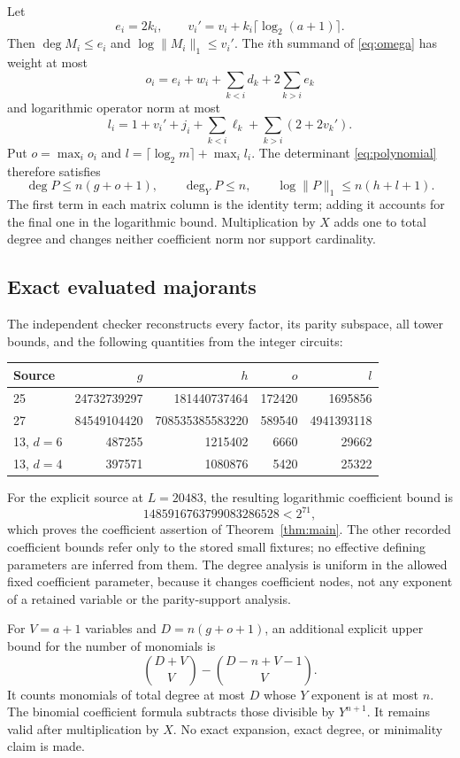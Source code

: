 \documentclass[11pt,a4paper]{article}
\theoremstyle{remark}\newtheorem{remark}[theorem]{Remark}
\begin{document}
Let
\[
 e_i=2k_i,\qquad v_i'=v_i+k_i\lceil\log_2(a+1)\rceil.
\]
Then $\deg M_i\le e_i$ and $\log\|M_i\|_1\le v_i'$.
The $i$th summand of \eqref{eq:omega} has weight at most
\[
 o_i=e_i+w_i+\sum_{k<i}d_k+2\sum_{k>i}e_k
\]
and logarithmic operator norm at most
\[
 l_i=1+v_i'+j_i+\sum_{k<i}\ell_k+\sum_{k>i}(2+2v_k').
\]
Put $o=\max_i o_i$ and $l=\lceil\log_2m\rceil+\max_i l_i$.
The determinant \eqref{eq:polynomial} therefore satisfies
\begin{equation}\label{eq:finalbounds}
 \deg P\le n(g+o+1),\qquad \deg_Y P\le n,\qquad
                         \log\|P\|_1\le n(h+l+1).
\end{equation}
The first term in each matrix column is the identity term; adding it
accounts for the final one in the logarithmic bound. Multiplication by
$X$ adds one to total degree and changes neither coefficient norm nor
support cardinality.

\subsection{Exact evaluated majorants}
The independent checker reconstructs every factor, its parity subspace,
all tower bounds, and the following quantities from the integer circuits:
\begin{center}\scriptsize
\begin{tabular}{lrrrr}\toprule
Source&$g$&$h$&$o$&$l$\\\midrule
25&24732739297&181440737464&172420&1695856\\
27&84549104420&708535385583220&589540&4941393118\\
13, $d=6$&487255&1215402&6660&29662\\
13, $d=4$&397571&1080876&5420&25322\\\bottomrule
\end{tabular}\end{center}
For the explicit source at $L=20483$, the resulting logarithmic
coefficient bound is
\[
               1485916763799083286528<2^{71},
\]
which proves the coefficient assertion of Theorem~\ref{thm:main}.
The other recorded coefficient bounds refer only to the stored small
fixtures; no effective defining parameters are inferred from them.
The degree analysis is uniform in the allowed fixed coefficient
parameter, because it changes coefficient nodes, not any exponent of
a retained variable or the parity-support analysis.

For $V=a+1$ variables and $D=n(g+o+1)$, an additional explicit upper
bound for the number of monomials is
\[
       \binom{D+V}{V}-\binom{D-n+V-1}{V}.
\]
It counts monomials of total degree at most $D$ whose $Y$ exponent is
at most $n$. The binomial coefficient formula subtracts those divisible
by $Y^{n+1}$. It remains valid after multiplication by $X$.
No exact expansion, exact degree, or minimality claim is made.
\end{document}
